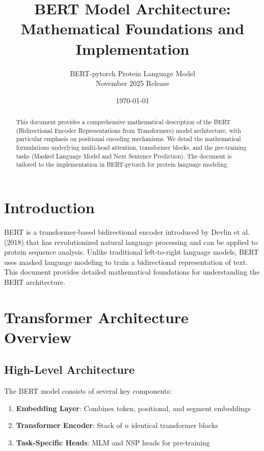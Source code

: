 \documentclass[11pt,a4paper]{article}
\title{\Large \textbf{BERT Model Architecture: Mathematical Foundations and Implementation}}
\author{BERT-pytorch Protein Language Model \\ November 2025 Release}
\date{\today}
\begin{document}
\maketitle

\begin{abstract}
This document provides a comprehensive mathematical description of the BERT (Bidirectional Encoder Representations from Transformers) model architecture, with particular emphasis on positional encoding mechanisms. We detail the mathematical formulations underlying multi-head attention, transformer blocks, and the pre-training tasks (Masked Language Model and Next Sentence Prediction). The document is tailored to the implementation in BERT-pytorch for protein language modeling.
\end{abstract}

\tableofcontents
\newpage

\section{Introduction}

BERT is a transformer-based bidirectional encoder introduced by Devlin et al. (2018) that has revolutionized natural language processing and can be applied to protein sequence analysis. Unlike traditional left-to-right language models, BERT uses masked language modeling to train a bidirectional representation of text. This document provides detailed mathematical foundations for understanding the BERT architecture.

\section{Transformer Architecture Overview}

\subsection{High-Level Architecture}

The BERT model consists of several key components:

\begin{enumerate}
    \item \textbf{Embedding Layer}: Combines token, positional, and segment embeddings
    \item \textbf{Transformer Encoder}: Stack of $n$ identical transformer blocks
    \item \textbf{Task-Specific Heads}: MLM and NSP heads for pre-training
\end{enumerate}
\end{document}
